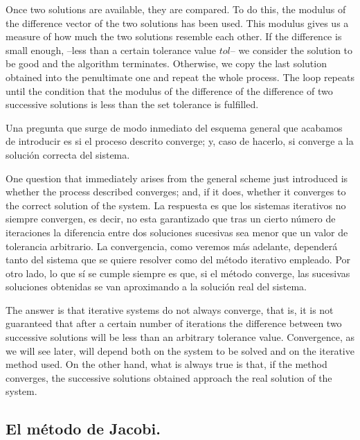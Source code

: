 \begin{paracol}{2}
\switchcolumn
Once two solutions are available, they are compared. To do this, the modulus of the difference vector of the two solutions has been used. This modulus gives us a measure of how much the two solutions resemble each other. If the difference is small enough, --less than a certain tolerance value $tol$-- we consider the solution to be good and the algorithm terminates. Otherwise, we copy the last solution obtained into the penultimate one and repeat the whole process. The loop repeats until the condition that the modulus of the difference of the difference of two successive solutions is less than the set tolerance is fulfilled.

\switchcolumn

Una pregunta que surge de modo inmediato del esquema general que acabamos de introducir es si el proceso descrito converge; y, caso de hacerlo, si converge a la solución correcta del sistema. 

\switchcolumn

One question that immediately arises from the general scheme just introduced is whether the process described converges; and, if it does, whether it converges to the correct solution of the system. 
\switchcolumn
La respuesta es que los sistemas iterativos no siempre convergen, es decir, no esta garantizado que tras un cierto número de iteraciones la diferencia entre dos soluciones sucesivas sea menor que un valor de tolerancia arbitrario. La convergencia, como veremos más adelante, dependerá tanto del sistema que se quiere resolver como del método iterativo empleado. Por otro lado, lo que sí se cumple siempre es que, si el método converge, las sucesivas soluciones obtenidas se van aproximando a la solución real del sistema.

\switchcolumn
The answer is that iterative systems do not always converge, that is, it is not guaranteed that after a certain number of iterations the difference between two successive solutions will be less than an arbitrary tolerance value. Convergence, as we will see later, will depend both on the system to be solved and on the iterative method used. On the other hand, what is always true is that, if the method converges, the successive solutions obtained approach the real solution of the system.


\switchcolumn
\subsection{El método de Jacobi.} 


\end{paracol}
